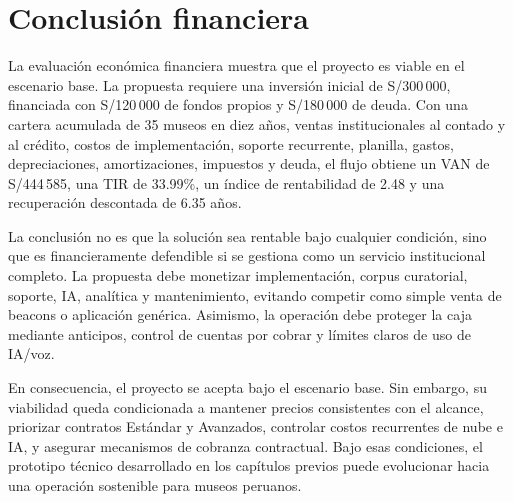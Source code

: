 \section{Conclusión financiera}

La evaluación económica financiera muestra que el proyecto es viable en el escenario base. La propuesta requiere una inversión inicial de S/300\,000, financiada con S/120\,000 de fondos propios y S/180\,000 de deuda. Con una cartera acumulada de 35 museos en diez años, ventas institucionales al contado y al crédito, costos de implementación, soporte recurrente, planilla, gastos, depreciaciones, amortizaciones, impuestos y deuda, el flujo obtiene un VAN de S/444\,585, una TIR de 33.99\%, un índice de rentabilidad de 2.48 y una recuperación descontada de 6.35 años.

La conclusión no es que la solución sea rentable bajo cualquier condición, sino que es financieramente defendible si se gestiona como un servicio institucional completo. La propuesta debe monetizar implementación, corpus curatorial, soporte, IA, analítica y mantenimiento, evitando competir como simple venta de beacons o aplicación genérica. Asimismo, la operación debe proteger la caja mediante anticipos, control de cuentas por cobrar y límites claros de uso de IA/voz.

En consecuencia, el proyecto se acepta bajo el escenario base. Sin embargo, su viabilidad queda condicionada a mantener precios consistentes con el alcance, priorizar contratos Estándar y Avanzados, controlar costos recurrentes de nube e IA, y asegurar mecanismos de cobranza contractual. Bajo esas condiciones, el prototipo técnico desarrollado en los capítulos previos puede evolucionar hacia una operación sostenible para museos peruanos.

\endgroup
